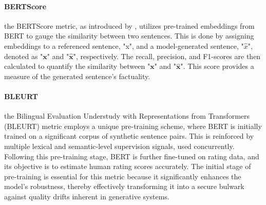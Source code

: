 \paragraph{BERTScore}
the BERTScore metric, as introduced by \citet{zhang2020bertscore}, utilizes pre-trained embeddings from BERT to gauge the similarity between two sentences. This is done by assigning embeddings to a referenced sentence, "x", and a model-generated sentence, "$\hat{x}$", denoted as "$\mathbf{x}$" and "$ \mathbf{\hat{x}}$", respectively. The recall, precision, and F1-scores are then calculated to quantify the similarity between "$\mathbf{x}$" and "$ \mathbf{\hat{x}}$". This score provides a measure of the generated sentence's factuality.

\paragraph{BLEURT}
the Bilingual Evaluation Understudy with Representations from Transformers (BLEURT) metric \citep{sellam2020bleurt} employs a unique pre-training scheme, where BERT is initially trained on a significant corpus of synthetic sentence pairs. This is reinforced by multiple lexical and semantic-level supervision signals, used concurrently. Following this pre-training stage, BERT is further fine-tuned on rating data, and its objective is to estimate human rating scores accurately. The initial stage of pre-training is essential for this metric because it significantly enhances the model's robustness, thereby effectively transforming it into a secure bulwark against quality drifts inherent in generative systems.

